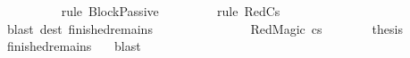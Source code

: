 \begin{isabellebody}
\ \ \ \ \ \ \ \ \isamarkupfalse%
\ {\isacharparenleft}{\kern0pt}rule\ BlockPassive{\isacharparenright}{\kern0pt}\isanewline
\ \ \ \ \ \ \ \isamarkupfalse%
\ {\isacharparenleft}{\kern0pt}rule\ RedCs{}{\isacharparenright}{\kern0pt}\isanewline
\ \ \ \ \ \ \isamarkupfalse%
\ {\isacharparenleft}{\kern0pt}blast\ dest{\isacharcolon}{\kern0pt}\ finished{\isacharunderscore}{\kern0pt}remains{\isacharparenright}{\kern0pt}\isanewline
\ \ \ \ \ \ \isamarkupfalse%
\isanewline
\ \ \isamarkupfalse%
\isanewline
\ \ \ \ \isamarkupfalse%
\ {\isacharparenleft}{\kern0pt}RedMagic\ cs{\isacharparenright}{\kern0pt}\isanewline
\ \ \ \ \isamarkupfalse%
\ \isamarkupfalse%
\ {\isacharquery}{\kern0pt}thesis\ \isamarkupfalse%
\ finished{\isacharunderscore}{\kern0pt}remains\ {}\ \isamarkupfalse%
\ blast\isanewline
\ \ \isamarkupfalse%
\isanewline
{}\isamarkupfalse%
%
\endisatagproof
{\isafoldproof}%
%
\isadelimproof
\ \ \ \ \ \ \ \ \ \ \ \ \ \ \ \ \ \ \ \isanewline
%
\endisadelimproof
\isanewline
{}\isamarkupfalse%
\isanewline
%
\isadelimtheory
\isanewline
%
\endisadelimtheory
%
\isatagtheory
{}\isamarkupfalse%
%
\endisatagtheory
{\isafoldtheory}%
%
\isadelimtheory
%
\endisadelimtheory
%
\end{isabellebody}%
\endinput
